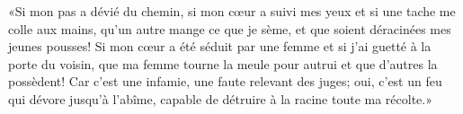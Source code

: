 «Si mon pas a dévié du chemin,
	si mon cœur a suivi mes yeux et si une tache me colle aux mains,
	qu’un autre mange ce que je sème, et que soient déracinées mes jeunes pousses!
Si mon cœur a été séduit par une femme et si j’ai guetté à la porte du voisin,
	que ma femme tourne la meule pour autrui et que d’autres la possèdent!
Car c’est une infamie, une faute relevant des juges;
	oui, c’est un feu qui dévore jusqu’à l’abîme,
	capable de détruire à la racine toute ma récolte.»
